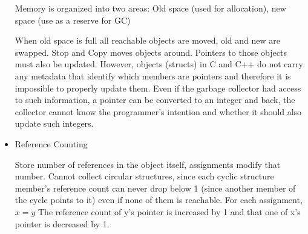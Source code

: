 \documentclass[10pt,landscape]{article}
\begin{document}
\begin{multicols}{3}
\begin{itemize}
	Memory is organized into two areas: Old space (used for allocation), new space (use as a reserve for GC)
	
	When old space is full all reachable objects are moved, old and new are swapped.
  Stop and Copy moves objects around. Pointers to those objects must also be updated.
However, objects (structs) in C and C++ do not carry any metadata that identify which
members are pointers and therefore it is impossible to properly update them. Even if the
garbage collector had access to such information, a pointer can be converted to an integer
and back, the collector cannot know the programmer’s intention and whether it should also
update such integers.
	\item Reference Counting
	
	Store number of references in the object itself, assignments modify that number. Cannot collect circular structures, since each cyclic structure member’s reference count can never drop below 1 (since another
  member of the cycle points to it) even if none of them is reachable.
	For each assignment, $x = y$ The reference count of y's pointer is increased by 1 and that one of x's pointer is decreased by 1.

\end{itemize}
\newpage
\end{multicols}
\end{document}
